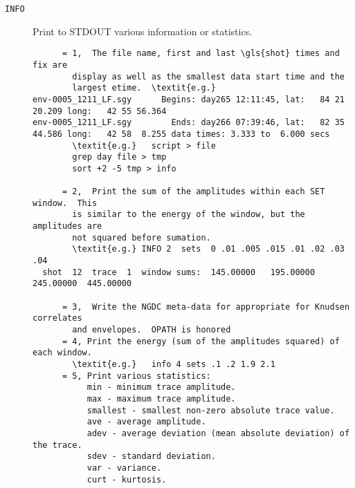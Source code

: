 \begin{description}
\item[\texttt{INFO}] Print to STDOUT various information or statistics.
\begin{verbatim}
      = 1,  The file name, first and last \gls{shot} times and fix are
        display as well as the smallest data start time and the
        largest etime.  \textit{e.g.}
env-0005_1211_LF.sgy      Begins: day265 12:11:45, lat:   84 21 20.209 long:   42 55 56.364
env-0005_1211_LF.sgy        Ends: day266 07:39:46, lat:   82 35 44.586 long:   42 58  8.255 data times: 3.333 to  6.000 secs
        \textit{e.g.}   script > file
        grep day file > tmp
        sort +2 -5 tmp > info

      = 2,  Print the sum of the amplitudes within each SET window.  This
        is similar to the energy of the window, but the amplitudes are
        not squared before sumation.
        \textit{e.g.} INFO 2  sets  0 .01 .005 .015 .01 .02 .03 .04
  shot  12  trace  1  window sums:  145.00000   195.00000   245.00000  445.00000

      = 3,  Write the NGDC meta-data for appropriate for Knudsen correlates
        and envelopes.  OPATH is honored
      = 4, Print the energy (sum of the amplitudes squared) of each window.
        \textit{e.g.}   info 4 sets .1 .2 1.9 2.1
      = 5, Print various statistics:
           min - minimum trace amplitude.
           max - maximum trace amplitude.
           smallest - smallest non-zero absolute trace value.
           ave - average amplitude.
           adev - average deviation (mean absolute deviation) of the trace.
           sdev - standard deviation.
           var - variance.
           curt - kurtosis.
\end{verbatim}


\end{description}
